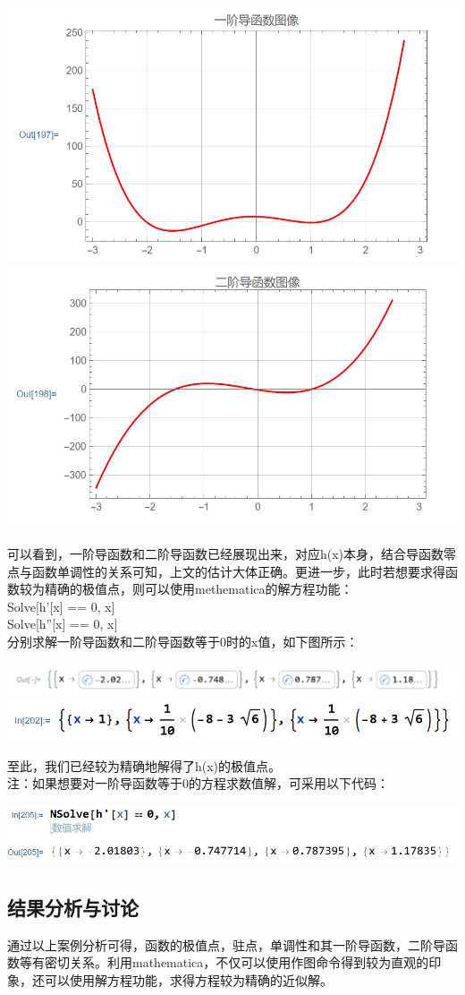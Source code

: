 \documentclass{ctexart}
\begin{document}
\begin{center}
	\includegraphics[scale=0.5]{一阶导函数.png}
	\includegraphics[scale=0.5]{二阶导函数.png}
\end{center}
可以看到，一阶导函数和二阶导函数已经展现出来，对应h(x)本身，结合导函数零点与函数单调性的关系可知，上文的估计大体正确。更进一步，此时若想要求得函数较为精确的极值点，则可以使用methematica的解方程功能：\\
Solve[h'[x] == 0, x]\\
Solve[h''[x] == 0, x]\\
分别求解一阶导函数和二阶导函数等于0时的x值，如下图所示：
\begin{center}
	\includegraphics[scale=0.5]{一阶导函数的解.png}
	\includegraphics[scale=0.5]{二阶导函数的解.png}
\end{center}
至此，我们已经较为精确地解得了h(x)的极值点。\\
注：如果想要对一阶导函数等于0的方程求数值解，可采用以下代码：\\
\begin{center}
	\includegraphics[scale=0.5]{注解.png}
\end{center}
\subsection{结果分析与讨论}
通过以上案例分析可得，函数的极值点，驻点，单调性和其一阶导函数，二阶导函数等有密切关系。利用mathematica，不仅可以使用作图命令得到较为直观的印象，还可以使用解方程功能，求得方程较为精确的近似解。
\end{document}
